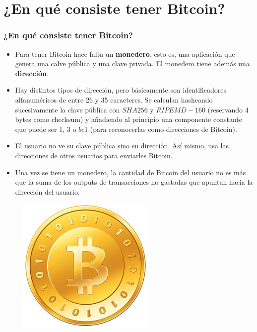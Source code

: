 \documentclass{beamer}
\theoremstyle{definition}
\begin{document}
\section{¿En qué consiste tener Bitcoin?}
\begin{frame}
	\frametitle{¿En qué consiste tener Bitcoin?}
	\begin{itemize}
		\item<1-> Para tener Bitcoin hace falta un \textbf{monedero}, esto es, una aplicación que genera una calve pública y una clave privada. El monedero tiene además una \textbf{dirección}. 
		\item<2-> Hay distintos tipos de dirección, pero básicamente son identificadores alfanuméricos de entre 26 y 35 caracteres. Se calculan hasheando sucesivamente la clave pública con $SHA256$ y $RIPEMD-160$ (reservando 4 bytes como checksum) y añadiendo al principio una componente constante que puede ser $1$, $3$ o $bc1$ (para reconocerlas como direcciones de Bitcoin). 
	\end{itemize}
\end{frame}

\begin{frame}
	\begin{itemize}
		\item<1-> El usuario no ve su clave pública sino su dirección. Así mismo, usa las direcciones de otros usuarios para enviarles Bitcoin.
		\item<2-> Una vez se tiene un monedero, la cantidad de Bitcoin del usuario no es más que la suma de los outputs de transacciones no gastadas que apuntan hacia la dirección del usuario.
	\end{itemize}
\end{frame}

\begin{frame}
	\begin{figure}
	\includegraphics[scale=0.7]{bitcoin}
\end{figure}
\end{frame}
\end{document}
